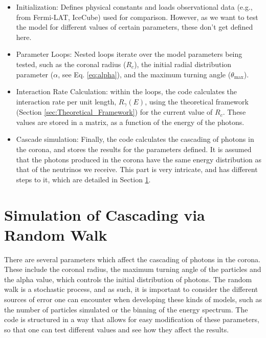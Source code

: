 \begin{itemize}
    \item Initialization: Defines physical constants and loads observational data (e.g., from Fermi-LAT, IceCube) used for comparison. However, as we want to test the model for different values of certain parameters, these don't get defined here.
    \item Parameter Loops: Nested loops iterate over the model parameters being tested, such as the coronal radius ($R_c$), the initial radial distribution parameter ($\alpha$, see Eq. \ref{eq:alpha}), and the maximum turning angle ($\theta_{\max}$).
    \item Interaction Rate Calculation: within the loops, the code calculates the interaction rate per unit length, $R_{\gamma}(E)$, using the theoretical framework (Section \ref{sec:Theoretical_Framework}) for the current value of $R_c$. These values are stored in a matrix, as a function of the energy of the photons.
    \item Cascade simulation: Finally, the code calculates the cascading of photons in the corona, and stores the results for the parameters defined. It is assumed that the photons produced in the corona have the same energy distribution as that of the neutrinos we receive. 
    This part is very intricate, and has different steps to it, which are detailed in Section \ref{sec:RandomWalk}.
\end{itemize}

\section{Simulation of Cascading via Random Walk}
\label{sec:RandomWalk}

There are several parameters which affect the cascading of photons in the corona. These include the coronal radius, the maximum turning angle of the particles and the alpha value, which controls the initial distribution of photons. The random walk is a stochastic process, and as such, it is important to consider the different sources of error one can encounter when developing these kinds of models, such as the number of particles simulated or the binning of the energy spectrum. The code is structured in a way that allows for easy modification of these parameters, so that one can test different values and see how they affect the results.

